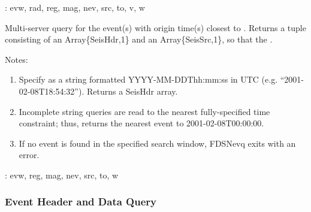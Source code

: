 \documentclass[letterpaper,11pt,english]{sphinxmanual}
\begin{document}
\begin{fulllineitems}
\end{fulllineitems}


{\hyperref[\detokenize{src/Appendices/keywords:dkw}]{}}: evw, rad, reg, mag, nev, src, to, v, w

Multi-server query for the event(s) with origin time(s) closest to . Returns
a tuple consisting of an Array\{SeisHdr,1\} and an Array\{SeisSrc,1\}, so that
the .

Notes:
\begin{enumerate}
\def\theenumi{\arabic{enumi}}
\def\labelenumi{\theenumi .}
\makeatletter\def\p@enumii{\p@enumi \theenumi .}\makeatother
\item {} 
Specify  as a string formatted YYYY-MM-DDThh:mm:ss in UTC (e.g. “2001-02-08T18:54:32”). Returns a SeisHdr array.

\item {} 
Incomplete string queries are read to the nearest fully-specified time constraint; thus,  returns the nearest event to 2001-02-08T00:00:00.

\item {} 
If no event is found in the specified search window, FDSNevq exits with an error.

\end{enumerate}

\begin{DUlineblock}{0em}
\item[] {\hyperref[\detokenize{src/Appendices/keywords:dkw}]{}}: evw, reg, mag, nev, src, to, w
\end{DUlineblock}


\subsubsection{Event Header and Data Query}
\label{\detokenize{src/Submodules/quake:event-header-and-data-query}}

\begin{fulllineitems}
\label{\detokenize{src/Submodules/quake:FDSNevt}}
\end{fulllineitems}
\end{document}
